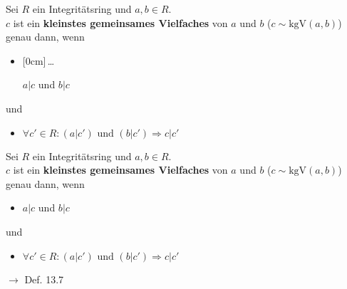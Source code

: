 \documentclass[11pt]{article}
\renewcommand{\cite}[1]{\par\bigskip\hfill{\color{gray}\tiny\(\to\) #1}}
\newcommand{\hide}[1]{\parbox{0cm}{\raisebox{-7pt}[0cm]{\dots}}\color{white}#1\color{black}}
\let\olddots\dots
\renewcommand{\dots}{\,\olddots\,}
\newenvironment{field}{}{\newpage}
\newif\ifnote
\newenvironment{note}{\notetrue}{\notefalse}
\newcommand{\localtag}{}
\newcommand{\globaltag}{}
\newcommand{\uuid}{}
\newcommand{\tags}[1]{
    \ifnote
        \renewcommand{\localtag}{#1}
    \else
        \renewcommand{\globaltag}{#1}
    \fi
    }
\newcommand{\xplain}[1]{\renewcommand{\uuid}{#1}}
\begin{document}
\begin{note}
    \tags{Def}
    \xplain{c29e019b-0c2c-4dec-94e0-316d6e0f0112}

    \begin{field}
        Sei $R$ ein Integritätsring und $a,b\in R$.\\
        $c$ ist ein \textbf{kleinstes gemeinsames Vielfaches} von $a$ und $b$ ($c \sim \text{kgV}(a,b)$) genau dann, wenn
        \begin{itemize}
            \item \hide{$a\vert c$ und $b\vert c$}
        \end{itemize}
        und
        \begin{itemize}
            \item $\forall c'\in R\colon (a\vert c') \text{ und } (b\vert c') \Rightarrow c\vert c'$
        \end{itemize}
    \end{field}
    \begin{field}
        Sei $R$ ein Integritätsring und $a,b\in R$.\\
        $c$ ist ein \textbf{kleinstes gemeinsames Vielfaches} von $a$ und $b$ ($c \sim \text{kgV}(a,b)$) genau dann, wenn
        \begin{itemize}
            \item $a\vert c$ und $b\vert c$
        \end{itemize}
        und
        \begin{itemize}
            \item $\forall c'\in R\colon (a\vert c') \text{ und } (b\vert c') \Rightarrow c\vert c'$
        \end{itemize}
        \cite{Def. 13.7}
    \end{field}


\end{note}
\end{document}
